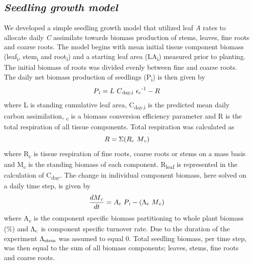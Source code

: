 \documentclass[a4paper]{article}\usepackage[]{graphicx}\usepackage[]{color}
\begin{document}
\subsection*{\textit{Seedling growth model}}
We developed a simple seedling growth model that utilized leaf \textit{A} rates to allocate daily \textit{C} assimilate towards biomass production of stems, leaves, fine roots and coarse roots. The model begins with mean initial tissue component biomass (leaf\textsubscript{i}, stem\textsubscript{i} and root\textsubscript{i}) and a starting leaf area (LA\textsubscript{i}) measured prior to planting. The initial biomass of roots was divided evenly between fine and coarse roots. The daily net biomass production of seedlings (P\textsubscript{i}) is then given by
\begin{equation} P\textsubscript{i}=L~C\textsubscript{day,i}~\epsilon\textsubscript{c}\textsuperscript{-1}-R
\label{eq:prod}
\end{equation}
where L is standing cumulative leaf area, C\textsubscript{day,i} is the predicted mean daily carbon assimilation, \textepsilon\textsubscript{c} is a biomass conversion efficiency parameter and R is the total respiration of all tissue components. Total respiration was calculated as 
\begin{equation} R=\Sigma(R\textsubscript{c}~M\textsubscript{c})
\label{eq:resp}
\end{equation}
where R\textsubscript{c} is tissue respiration of fine roots, coarse roots or stems on a mass basis and M\textsubscript{c} is the standing biomass of each component. R\textsubscript{leaf} is represented in the calculation of C\textsubscript{day}. The change in individual component biomass, here solved on a daily time step, is given by
\begin{equation} \frac{dM\textsubscript{c}}{dt}=A\textsubscript{c}~P\textsubscript{i}-(\Lambda\textsubscript{c}~M\textsubscript{c})
\label{eq:mass}
\end{equation}
where A\textsubscript{c} is the component specific biomass partitioning  to whole plant biomass (\%) and $\Lambda\textsubscript{c}$ is component specific turnover rate. Due to the duration of the experiment $\Lambda\textsubscript{stem}$ was assumed to equal 0.  Total seedling biomass, per time step, was then equal to the sum of all biomass components; leaves, stems, fine roots and coarse roots. 
\end{document}
